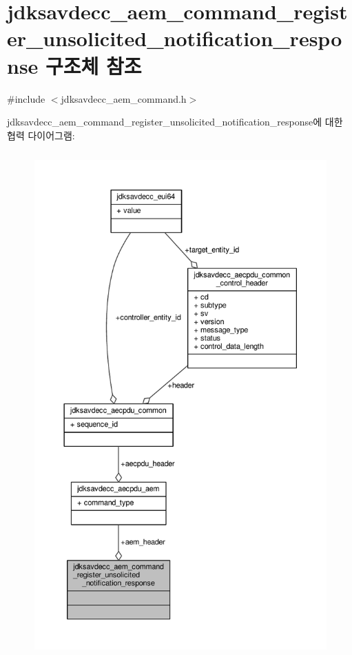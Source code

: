 \hypertarget{structjdksavdecc__aem__command__register__unsolicited__notification__response}{}\section{jdksavdecc\+\_\+aem\+\_\+command\+\_\+register\+\_\+unsolicited\+\_\+notification\+\_\+response 구조체 참조}
\label{structjdksavdecc__aem__command__register__unsolicited__notification__response}


{\ttfamily \#include $<$jdksavdecc\+\_\+aem\+\_\+command.\+h$>$}



jdksavdecc\+\_\+aem\+\_\+command\+\_\+register\+\_\+unsolicited\+\_\+notification\+\_\+response에 대한 협력 다이어그램\+:
\nopagebreak
\begin{figure}[H]
\begin{center}
\leavevmode
\includegraphics[height=550pt]{structjdksavdecc__aem__command__register__unsolicited__notification__response__coll__graph}
\end{center}
\end{figure}
